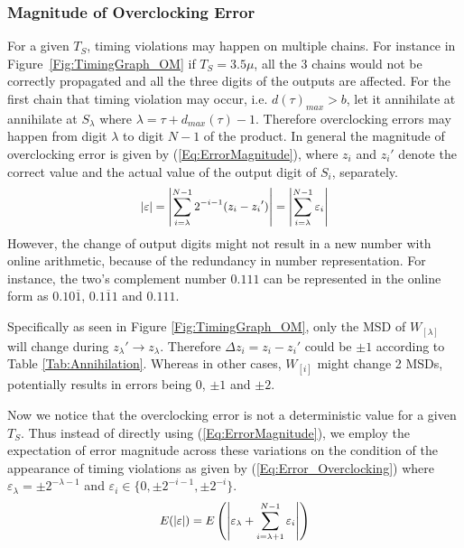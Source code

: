 \documentclass{acm_proc_article-sp}
\begin{document}
\subsubsection{Magnitude of Overclocking Error}
For a given $T_S$, timing violations may happen on multiple chains. For instance in Figure~\ref{Fig:TimingGraph_OM} if $T_S=3.5\mu$, all the 3 chains would not be correctly propagated and all the three digits of the outputs are affected. For the first chain that timing violation may occur, i.e. $d(\tau)_{max}>b$, let it annihilate at annihilate at $S_{\lambda}$ where $\lambda=\tau+d_{max}(\tau)-1$. Therefore overclocking errors may happen from digit $\lambda$ to digit $N-1$ of the product. In general the magnitude of overclocking error is given by (\ref{Eq:ErrorMagnitude}), where $z_i$ and ${z_i}'$ denote the correct value and the actual value of the output digit of $S_i$, separately.
%
\begin{eqnarray}\label{Eq:ErrorMagnitude}
\scriptsize
  \left|\varepsilon\right|=\left|\sum_{i=\lambda}^{N-1}2^{-i-1}(z_i-{z_i}')\right|=\left|\sum_{i=\lambda}^{N-1} \varepsilon_i\right|
\normalsize
\end{eqnarray}
%
However, the change of output digits might not result in a new number with online arithmetic, because of the redundancy in number representation. For instance, the two's complement number $0.111$ can be represented in the online form as $0.10\overline{1}$, $0.1\overline{1}1$ and $0.111$.

Specifically as seen in Figure \ref{Fig:TimingGraph_OM}, only the MSD of ${W}_{[\lambda]}$ will change during ${z_\lambda}'\rightarrow z_\lambda$. Therefore $\Delta z_i=z_i-{z_i}'$ could be $\pm1$ according to Table \ref{Tab:Annihilation}. Whereas in other cases, ${W}_{[i]}$ might change 2 MSDs, potentially results in errors being $0$, $\pm1$ and $\pm2$.

Now we notice that the overclocking error is not a deterministic value for a given $T_S$. Thus instead of directly using (\ref{Eq:ErrorMagnitude}), we employ the expectation of error magnitude across these variations on the condition of the appearance of timing violations as given by (\ref{Eq:Error_Overclocking}) where $\varepsilon_\lambda=\pm2^{-\lambda-1}$ and $\varepsilon_i\in\{0,\pm2^{-i-1},\pm2^{-i}\}$.
%
\begin{eqnarray}\label{Eq:Error_Overclocking}
\scriptsize
      E(|\varepsilon|)=E\left(\left|\varepsilon_\lambda+\sum_{i=\lambda+1}^{N-1}\varepsilon_i \right|\right)
\normalsize
\end{eqnarray}
\end{document}
